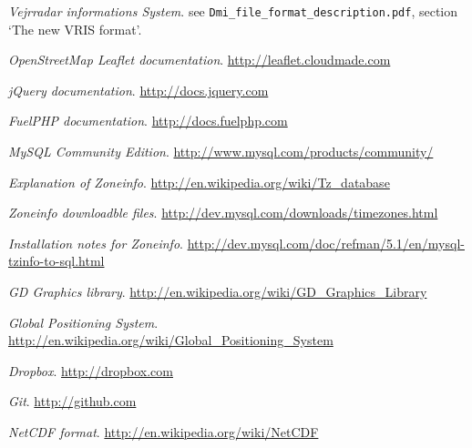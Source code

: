 \renewcommand\bibname{References}

\begin{thebibliography}{10}
\emph{Vejrradar informations System}.
see \texttt{Dmi\_file\_format\_description.pdf}, section `The new VRIS format'.

\emph{OpenStreetMap Leaflet documentation}.
\url{http://leaflet.cloudmade.com}

\emph{jQuery documentation}.
\url{http://docs.jquery.com}

\emph{FuelPHP documentation}.
\url{http://docs.fuelphp.com}

\emph{MySQL Community Edition}.
\url{http://www.mysql.com/products/community/}

\emph{Explanation of Zoneinfo}.
\url{http://en.wikipedia.org/wiki/Tz_database}

\emph{Zoneinfo downloadble files}.
\url{http://dev.mysql.com/downloads/timezones.html}

\emph{Installation notes for Zoneinfo}.
\url{http://dev.mysql.com/doc/refman/5.1/en/mysql-tzinfo-to-sql.html}

\emph{GD Graphics library}.
\url{http://en.wikipedia.org/wiki/GD_Graphics_Library}

\emph{Global Positioning System}.
\url{http://en.wikipedia.org/wiki/Global_Positioning_System}

\emph{Dropbox}.
\url{http://dropbox.com}

\emph{Git}.
\url{http://github.com}

\emph{NetCDF format}.
\url{http://en.wikipedia.org/wiki/NetCDF}
\end{thebibliography}
